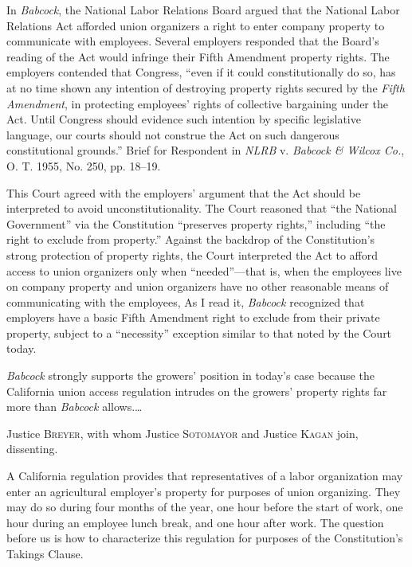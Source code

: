 In \textit{Babcock}, the National Labor Relations Board argued that the National
Labor Relations Act afforded union organizers a right to enter company property
to communicate with employees. Several employers responded that the Board's
reading of the Act would infringe their Fifth Amendment property rights. The
employers contended that Congress, ``even if it could constitutionally do so,
has at no time shown any intention of destroying property rights secured by the
\textit{Fifth Amendment}, in protecting employees' rights of collective
bargaining under the Act. Until Congress should evidence such intention by
specific legislative language, our courts should not construe the Act on such
dangerous constitutional grounds.'' Brief for Respondent in \textit{NLRB} v.
\textit{Babcock \& Wilcox Co.}, O. T. 1955, No. 250, pp. 18--19.


This Court agreed with the employers' argument that the Act should be
interpreted to avoid unconstitutionality. The Court reasoned that ``the National
Government'' via the Constitution ``preserves property rights,'' including ``the
right to exclude from property.'' Against the backdrop of the Constitution's
strong protection of property rights, the Court interpreted the Act to afford
access to union organizers only when ``needed''---that is, when the employees
live on company property and union organizers have no other reasonable means of
communicating with the employees, As I read it, \textit{Babcock} recognized that
employers have a basic Fifth Amendment right to exclude from their private
property, subject to a ``necessity'' exception similar to that noted by the
Court today. 

\textit{Babcock} strongly supports the growers' position in today's case because
the California union access regulation intrudes on the growers' property rights
far more than \textit{Babcock} allows.\ldots

\opinion Justice \textsc{Breyer}, with whom Justice \textsc{Sotomayor} and
Justice \textsc{Kagan} join, dissenting.

A California regulation provides that representatives of a labor organization
may enter an agricultural employer's property for purposes of union organizing.
They may do so during four months of the year, one hour before the start of
work, one hour during an employee lunch break, and one hour after work. The
question before us is how to characterize this regulation for purposes of the
Constitution's Takings Clause.


